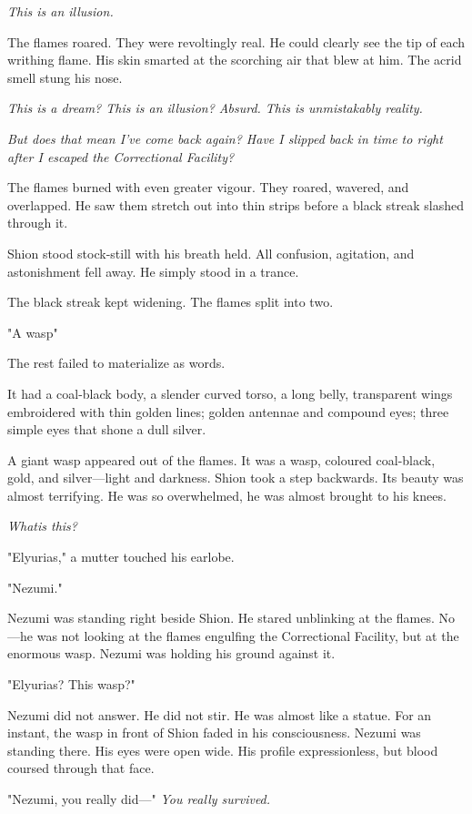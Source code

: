 \emph{This is an illusion.}

The flames roared. They were revoltingly real. He could clearly see the
tip of each writhing flame. His skin smarted at the scorching air that
blew at him. The acrid smell stung his nose.

\emph{This is a dream? This is an illusion? Absurd. This is unmistakably
reality.}

\emph{But does that mean I've come back again? Have I slipped back in time to
right after I escaped the Correctional Facility?}

The flames burned with even greater vigour. They roared, wavered, and
overlapped. He saw them stretch out into thin strips before a black
streak slashed through it.

Shion stood stock-still with his breath held. All confusion, agitation,
and astonishment fell away. He simply stood in a trance.

The black streak kept widening. The flames split into two.

"A wasp\el "

The rest failed to materialize as words.

It had a coal-black body, a slender curved torso, a long belly,
transparent wings embroidered with thin golden lines; golden antennae
and compound eyes; three simple eyes that shone a dull silver.

A giant wasp appeared out of the flames. It was a wasp, coloured
coal-black, gold, and silver---light and darkness. Shion took a step
backwards. Its beauty was almost terrifying. He was so overwhelmed, he
was almost brought to his knees.

\emph{What\el is this?}

"Elyurias," a mutter touched his earlobe.

"Nezumi."

Nezumi was standing right beside Shion. He stared unblinking at the
flames. No---he was not looking at the flames engulfing the Correctional
Facility, but at the enormous wasp. Nezumi was holding his ground
against it.

"Elyurias? This wasp?"

Nezumi did not answer. He did not stir. He was almost like a statue. For
an instant, the wasp in front of Shion faded in his consciousness.
Nezumi was standing there. His eyes were open wide. His profile
expressionless, but blood coursed through that face.

"Nezumi, you really did---" \emph{You really survived.}

